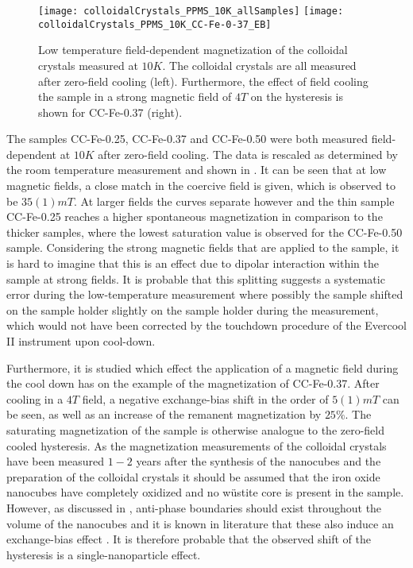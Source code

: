 \documentclass[\main/dresen_thesis.tex]{subfiles}
\begin{document}
    \begin{figure}[tb]
      \centering
      \texttt{[image: colloidalCrystals\_PPMS\_10K\_allSamples]}
      \texttt{[image: colloidalCrystals\_PPMS\_10K\_CC-Fe-0-37\_EB]}
      \caption{\label{fig:colloidalCrystals:10KVSM}Low temperature field-dependent magnetization of the colloidal crystals measured at $10 \unit{K}$. The colloidal crystals are all measured after zero-field cooling (left). Furthermore, the effect of field cooling the sample in a strong magnetic field of $4 \unit{T}$ on the hysteresis is shown for CC-Fe-0.37 (right).}
    \end{figure}
    The samples CC-Fe-0.25, CC-Fe-0.37 and CC-Fe-0.50 were both measured field-dependent at $10 \unit{K}$ after zero-field cooling. The data is rescaled as determined by the room temperature measurement and shown in .
    It can be seen that at low magnetic fields, a close match in the coercive field is given, which is observed to be $35(1) \unit{mT}$.
    At larger fields the curves separate however and the thin sample CC-Fe-0.25 reaches a higher spontaneous magnetization in comparison to the thicker samples, where the lowest saturation value is observed for the CC-Fe-0.50 sample.
    Considering the strong magnetic fields that are applied to the sample, it is hard to imagine that this is an effect due to dipolar interaction within the sample at strong fields.
    It is probable that this splitting suggests a systematic error during the low-temperature measurement where possibly the sample shifted on the sample holder slightly on the sample holder during the measurement, which would not have been corrected by the touchdown procedure of the Evercool II instrument upon cool-down.

    Furthermore, it is studied which effect the application of a magnetic field during the cool down has on the example of the magnetization of CC-Fe-0.37.
    After cooling in a $4 \unit{T}$ field, a negative exchange-bias shift in the order of $5(1) \unit{mT}$ can be seen, as well as an increase of the remanent magnetization by $25 \%$.
    The saturating magnetization of the sample is otherwise analogue to the zero-field cooled hysteresis.
    As the magnetization measurements of the colloidal crystals have been measured $1 - 2$ years after the synthesis of the nanocubes and the preparation of the colloidal crystals it should be assumed that the iron oxide nanocubes have completely oxidized and no w\"ustite core is present in the sample.
    However, as discussed in , anti-phase boundaries should exist throughout the volume of the nanocubes and it is known in literature that these also induce an exchange-bias effect \cite{Wetterskog_2013_Anoma}.
    It is therefore probable that the observed shift of the hysteresis is a single-nanoparticle effect.
\end{document}
